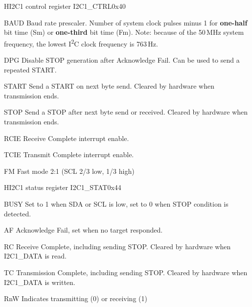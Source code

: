 \documentclass[12pt]{article}
\begin{document}
\begin{register}{H}{I2C1 control register I2C1\_CTRL}{0x40}
\label{i2c1ctrl}
%
%
%
%
%
%
%
%
%
\regnewline%
\end{register}
\begin{regdesc}[0.8\textwidth]\begin{reglist}[0000000i]
\item [BAUD] Baud rate prescaler. Number of system clock pulses minus 1 for \textbf{one-half} bit time (Sm) or \textbf{one-third} bit time (Fm).
Note: because of the 50\,MHz system frequency, the lowest I\textsuperscript{2}C clock frequency is 763\,Hz.
\item [DPG] Disable STOP generation after Acknowledge Fail. Can be used to send a repeated START.
\item [START] Send a START on next byte send. Cleared by hardware when transmission ends.
\item [STOP] Send a STOP after next byte send or received. Cleared by hardware when transmission ends.
\item [RCIE] Receive Complete interrupt enable.
\item [TCIE] Transmit Complete interrupt enable.
\item [FM] Fast mode 2:1 (SCL 2/3 low, 1/3 high)
\end{reglist}\end{regdesc}

\begin{register}{H}{I2C1 status register I2C1\_STAT}{0x44}
\label{i2c1stat}
%
%
%
%
%
%
\regnewline%
\end{register}
\begin{regdesc}[0.8\textwidth]\begin{reglist}[0000000]
\item [BUSY] Set to 1 when SDA or SCL is low, set to 0 when STOP condition is detected.
\item [AF] Acknowledge Fail, set when no target responded.
\item [RC] Receive Complete, including sending STOP. Cleared by hardware when I2C1\_DATA is read.
\item [TC] Transmission Complete, including sending STOP. Cleared by hardware when I2C1\_DATA is written.
\item [RnW] Indicates transmitting (0) or receiving (1)
\end{reglist}\end{regdesc}
\end{document}
